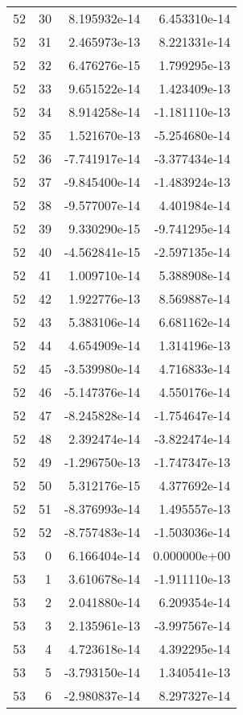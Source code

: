\begin{tabular}{rrrr}
  52 &   30 &  8.195932e-14 &  6.453310e-14 \\
  52 &   31 &  2.465973e-13 &  8.221331e-14 \\
  52 &   32 &  6.476276e-15 &  1.799295e-13 \\
  52 &   33 &  9.651522e-14 &  1.423409e-13 \\
  52 &   34 &  8.914258e-14 & -1.181110e-13 \\
  52 &   35 &  1.521670e-13 & -5.254680e-14 \\
  52 &   36 & -7.741917e-14 & -3.377434e-14 \\
  52 &   37 & -9.845400e-14 & -1.483924e-13 \\
  52 &   38 & -9.577007e-14 &  4.401984e-14 \\
  52 &   39 &  9.330290e-15 & -9.741295e-14 \\
  52 &   40 & -4.562841e-15 & -2.597135e-14 \\
  52 &   41 &  1.009710e-14 &  5.388908e-14 \\
  52 &   42 &  1.922776e-13 &  8.569887e-14 \\
  52 &   43 &  5.383106e-14 &  6.681162e-14 \\
  52 &   44 &  4.654909e-14 &  1.314196e-13 \\
  52 &   45 & -3.539980e-14 &  4.716833e-14 \\
  52 &   46 & -5.147376e-14 &  4.550176e-14 \\
  52 &   47 & -8.245828e-14 & -1.754647e-14 \\
  52 &   48 &  2.392474e-14 & -3.822474e-14 \\
  52 &   49 & -1.296750e-13 & -1.747347e-13 \\
  52 &   50 &  5.312176e-15 &  4.377692e-14 \\
  52 &   51 & -8.376993e-14 &  1.495557e-13 \\
  52 &   52 & -8.757483e-14 & -1.503036e-14 \\
  53 &    0 &  6.166404e-14 &  0.000000e+00 \\
  53 &    1 &  3.610678e-14 & -1.911110e-13 \\
  53 &    2 &  2.041880e-14 &  6.209354e-14 \\
  53 &    3 &  2.135961e-13 & -3.997567e-14 \\
  53 &    4 &  4.723618e-14 &  4.392295e-14 \\
  53 &    5 & -3.793150e-14 &  1.340541e-13 \\
  53 &    6 & -2.980837e-14 &  8.297327e-14 \\

\end{tabular}
